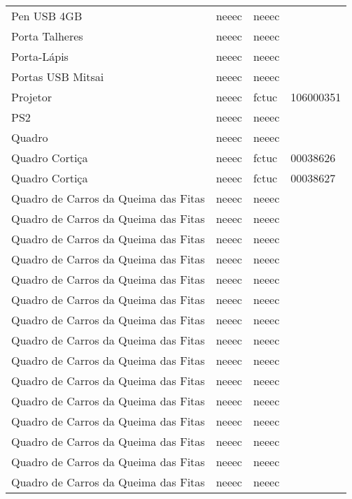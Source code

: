 \begin{longtable}{Xlll}
Pen USB 4GB & \acrshort{neeec} & \acrshort{neeec} & \\
Porta Talheres & \acrshort{neeec} & \acrshort{neeec} & \\
Porta-Lápis & \acrshort{neeec} & \acrshort{neeec} & \\
Portas USB Mitsai & \acrshort{neeec} & \acrshort{neeec} & \\
Projetor & \acrshort{neeec} & \acrshort{fctuc} & 106000351\\
PS2 & \acrshort{neeec} & \acrshort{neeec} & \\
Quadro & \acrshort{neeec} & \acrshort{neeec} & \\
Quadro Cortiça & \acrshort{neeec} & \acrshort{fctuc} & 00038626\\
Quadro Cortiça & \acrshort{neeec} & \acrshort{fctuc} & 00038627\\
Quadro de Carros da Queima das Fitas & \acrshort{neeec} & \acrshort{neeec} & \\
Quadro de Carros da Queima das Fitas & \acrshort{neeec} & \acrshort{neeec} & \\
Quadro de Carros da Queima das Fitas & \acrshort{neeec} & \acrshort{neeec} & \\
Quadro de Carros da Queima das Fitas & \acrshort{neeec} & \acrshort{neeec} & \\
Quadro de Carros da Queima das Fitas & \acrshort{neeec} & \acrshort{neeec} & \\
Quadro de Carros da Queima das Fitas & \acrshort{neeec} & \acrshort{neeec} & \\
Quadro de Carros da Queima das Fitas & \acrshort{neeec} & \acrshort{neeec} & \\
Quadro de Carros da Queima das Fitas & \acrshort{neeec} & \acrshort{neeec} & \\
Quadro de Carros da Queima das Fitas & \acrshort{neeec} & \acrshort{neeec} & \\
Quadro de Carros da Queima das Fitas & \acrshort{neeec} & \acrshort{neeec} & \\
Quadro de Carros da Queima das Fitas & \acrshort{neeec} & \acrshort{neeec} & \\
Quadro de Carros da Queima das Fitas & \acrshort{neeec} & \acrshort{neeec} & \\
Quadro de Carros da Queima das Fitas & \acrshort{neeec} & \acrshort{neeec} & \\
Quadro de Carros da Queima das Fitas & \acrshort{neeec} & \acrshort{neeec} & \\
Quadro de Carros da Queima das Fitas & \acrshort{neeec} & \acrshort{neeec} & \\

\end{longtable}
